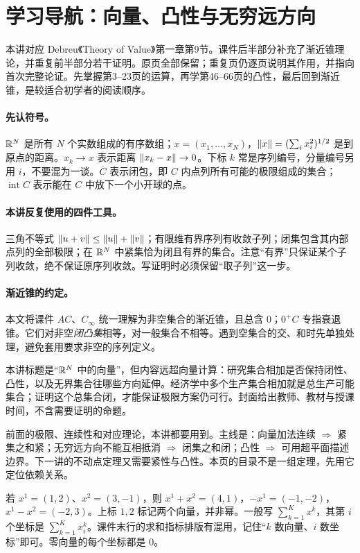 \section*{学习导航：向量、凸性与无穷远方向}
本讲对应 Debreu《Theory of Value》第一章第9节。课件后半部分补充了渐近锥理论，并重复前半部分若干证明。原页全部保留；重复页仍逐页说明其作用，并指向首次完整论证。先掌握第3--23页的运算，再学第46--66页的凸性，最后回到渐近锥，是较适合初学者的阅读顺序。

\paragraph{先认符号。} $\mathbb{R}^N$ 是所有 $N$ 个实数组成的有序数组；$x=(x_1,\ldots,x_N)$，$\left\lVert x\right\rVert=(\sum_i x_i^2)^{1/2}$ 是到原点的距离。$x_k\to x$ 表示距离 $\left\lVert x_k-x\right\rVert\to0$。下标 $k$ 常是序列编号，分量编号另用 $i$，不要混为一谈。$\overline C$ 表示闭包，即 $C$ 内点列所有可能的极限组成的集合；$\operatorname{int}C$ 表示能在 $C$ 中放下一个小开球的点。

\paragraph{本讲反复使用的四件工具。} 三角不等式 $\left\lVert u+v\right\rVert\le\left\lVert u\right\rVert+\left\lVert v\right\rVert$；有限维有界序列有收敛子列；闭集包含其内部点列的全部极限；在 $\mathbb{R}^N$ 中紧集恰为闭且有界的集合。注意“有界”只保证某个子列收敛，绝不保证原序列收敛。写证明时必须保留“取子列”这一步。

\paragraph{渐近锥的约定。} 本文将课件 $AC$、$C_\infty$ 统一理解为非空集合的渐近锥，且总含 $0$；$0^+C$ 专指衰退锥。它们对非空\emph{闭凸集}相等，对一般集合不相等。遇到空集合的交、和时先单独处理，避免套用要求非空的序列定义。

本讲标题是“$\mathbb{R}^N$ 中的向量”，但内容远超向量计算：研究集合相加是否保持闭性、凸性，以及无界集合往哪些方向延伸。经济学中多个生产集合相加就是总生产可能集合；证明这个总集合闭，才能保证极限方案仍可行。封面给出教师、教材与授课时间，不含需要证明的命题。

前面的极限、连续性和对应理论，本讲都要用到。主线是：向量加法连续 $\Rightarrow$ 紧集之和紧；无穷远方向不能互相抵消 $\Rightarrow$ 闭集之和闭；凸性 $\Rightarrow$ 可用超平面描述边界。下一讲的不动点定理又需要紧性与凸性。本页的目录不是一组定理，先用它定位依赖关系。

若 $x^1=(1,2)$、$x^2=(3,-1)$，则 $x^1+x^2=(4,1)$，$-x^1=(-1,-2)$，$x^1-x^2=(-2,3)$。上标 $1,2$ 标记两个向量，并非幂。一般写 $\sum_{k=1}^K x^k$，其第 $i$ 个坐标是 $\sum_{k=1}^K x_i^k$。课件末行的求和指标排版有混用，记住“$k$ 数向量、$i$ 数坐标”即可。零向量的每个坐标都是 $0$。

